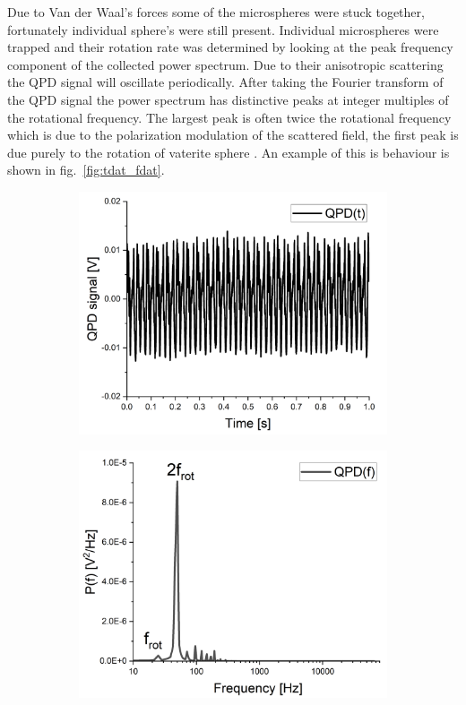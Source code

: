 Due to Van der Waal's forces some of the microspheres were stuck 
together, fortunately individual sphere's were still present. 
Individual microspheres were trapped and their rotation rate was 
determined by looking at the peak frequency component of the 
collected power spectrum. Due to their anisotropic scattering the 
QPD signal will oscillate periodically. After taking the Fourier
transform of the QPD signal the power spectrum has distinctive
peaks at integer multiples of the rotational frequency. The largest 
peak is often twice the rotational frequency which is due to the 
polarization modulation of the scattered field, the first peak 
is due purely to the rotation of vaterite sphere \cite{Monteiro2018}. 
An example of this is behaviour is shown in fig.~\ref{fig:tdat_fdat}.

\begin{figure}[h!]
	\begin{subfigure}{0.49\linewidth}
		\includegraphics[width=\linewidth]{time_domain_data.png}
	\end{subfigure}
	\begin{subfigure}{0.49\linewidth}
		\includegraphics[width=\linewidth]{frequency_domain_data.png}

\end{subfigure}
\end{figure}
